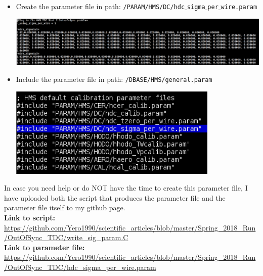 \documentclass[11pt]{article}
\begin{document}
\begin{itemize}
\item  Create the parameter file in path: \texttt{/PARAM/HMS/DC/hdc$\_$sigma$\_$per$\_$wire.param} \par
  \begin{minipage}{\linewidth}
    \centering
    \includegraphics[width=15cm]{param.png}
    \label{fig:param}
  \end{minipage}
\item  Include the parameter file in path: \texttt{/DBASE/HMS/general.param} \par
  \begin{minipage}{\linewidth}                                                          
    \centering
    \includegraphics[width=10cm]{gen_parm.png}
    \label{fig:gen_param}
  \end{minipage}
\end{itemize}
\noindent In case you need help or do NOT have the time to create this parameter file, I have uploaded both the script that produces the parameter file and the parameter file
itself to my github page. \\
\textbf{Link to script:} \\ \url{https://github.com/Yero1990/scientific_articles/blob/master/Spring_2018_Run/OutOfSync_TDC/write_sig_param.C} \\
\textbf{Link to parameter file:} \\\url{https://github.com/Yero1990/scientific_articles/blob/master/Spring_2018_Run/OutOfSync_TDC/hdc_sigma_per_wire.param}

\newpage
\onecolumn


\end{document}
